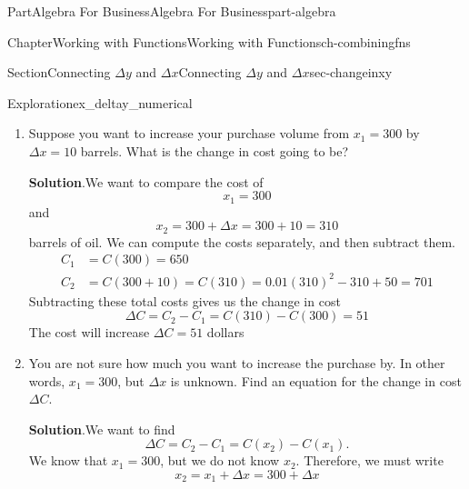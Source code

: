 \documentclass[oneside,10pt,]{tufte-book}
\newcommand{\blocktitlefont}{\relax}
\numberwithin{equation}{chapter}
\newcommand{\amp}{&}
\begin{document}
\begin{partptx}{Part}{Algebra For Business}{}{Algebra For Business}{}{}{part-algebra}
\begin{chapterptx}{Chapter}{Working with Functions}{}{Working with Functions}{}{}{ch-combiningfns}
\begin{sectionptx}{Section}{\textasteriskcentered{}Connecting \(\Delta y\) and \(\Delta x\)}{}{\textasteriskcentered{}Connecting \(\Delta y\) and \(\Delta x\)}{}{}{sec-changeinxy}
\begin{exploration}{Exploration}{}{ex_deltay_numerical}
\begin{enumerate}[font=\bfseries,label=(\alph*),ref=\alph*]
\begin{equation*}
\end{equation*}
The second cost is the cost of 600 barrels%
\begin{equation*}
C_2 = C(400) = 0.01(400)^2 - 400 + 50 = 1250  
\end{equation*}
The change in the cost is therefore%
\begin{equation*}
\Delta C = C(400) - C(300) = 1250 - 650 = 600
\end{equation*}
The \(\Delta x=100\) additional barrels will increase the total cost by \textdollar{}600 (an average of \textdollar{}6 per barrel).%
\item{}Suppose you want to increase your purchase volume from \(x_1=300\) by \(\Delta x = 10\) barrels. What is the change in cost going to be?%
\par\smallskip%
\noindent\textbf{\blocktitlefont Solution}.\hypertarget{ex_deltay_numerical-4-2}{}\quad{}We want to compare the cost of%
\begin{equation*}
x_1=300
\end{equation*}
and%
\begin{equation*}
x_2 = 300+\Delta x = 300+10=310
\end{equation*}
barrels of oil.  We can compute the costs separately, and then subtract them.%
\begin{align*}
C_1 \amp= C(300) = 650 \\
C_2 \amp= C(300+10) = C(310) = 0.01(310)^2 - 310 + 50 = 701 
\end{align*}
Subtracting these total costs gives us the change in cost%
\begin{equation*}
\Delta C = C_2 - C_1 = C(310)- C(300) =51
\end{equation*}
The cost will increase \(\Delta C = 51\) dollars%
\item{}You are not sure how much you want to increase the purchase by.  In other words, \(x_1=300\), but \(\Delta x\) is unknown. Find an equation for the change in cost \(\Delta C\).%
\par\smallskip%
\noindent\textbf{\blocktitlefont Solution}.\hypertarget{ex_deltay_numerical-5-2}{}\quad{}We want to find%
\begin{equation*}
\Delta C = C_2 - C_1 = C(x_2) - C(x_1)\text{.}
\end{equation*}
We know that \(x_1 = 300\), but we do not know \(x_2\).  Therefore, we must write%
\begin{equation*}
x_2 = x_1 + \Delta x= 300 + \Delta x
\end{equation*}
%
\par

\end{enumerate}
\end{exploration}
\end{sectionptx}
\end{chapterptx}
\end{partptx}
\end{document}
